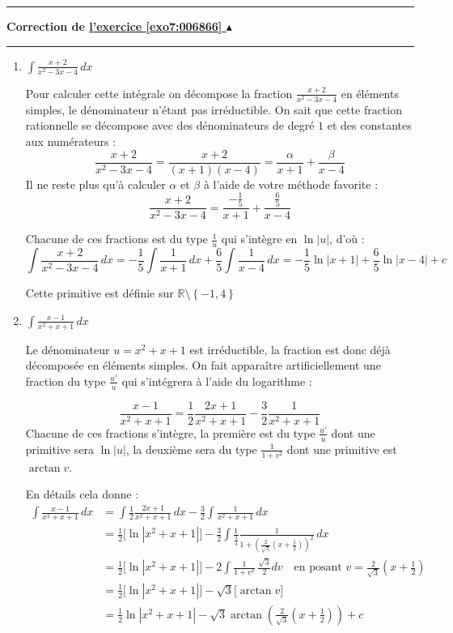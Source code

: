 \documentclass[11pt,a4paper]{article}
\newcommand{\Rr}{\mathbb{R}} \newcommand{\R}{\mathbb{R}}
\newcounter{exo}
\newcommand{\correction}[1]{\hypertarget{cor7:#1}{}\label{cor7:#1}{\bf Correction de \hyperlink{exo7:#1}{l'exercice \ref{exo7:#1} $\blacktriangle$}}\vspace{1mm}\hrule\vspace{1mm}}
\newcommand{\fincorrection}{\vspace{1mm}\hrule\vspace*{7mm}}
\begin{document}
\fincorrection
\correction{006866}
\begin{enumerate}
  \item $\int \frac{x+2}{x^2-3x-4}\,dx$

Pour calculer cette intégrale on décompose la fraction $\frac{x+2}{x^2-3x-4}$ en éléments simples, 
le dénominateur n'étant pas irréductible.
On sait que cette fraction rationnelle se décompose avec des dénominateurs de degré $1$ et des constantes aux numérateurs :
$$\frac{x+2}{x^2-3x-4} = \frac{x+2}{(x+1)(x-4)} = \frac{\alpha}{x+1} + \frac{\beta}{x-4}$$
Il ne reste plus qu'à calculer $\alpha$ et $\beta$ à l'aide de votre méthode favorite :
$$\frac{x+2}{x^2-3x-4}  = \frac{-\frac15}{x+1} + \frac{\frac65}{x-4}$$

Chacune de ces fractions est du type $\frac 1u$ qui s'intègre en $\ln |u|$, d'où :
$$\int \frac{x+2}{x^2-3x-4}\,dx = -\frac15\int \frac{1}{x+1}\,dx + \frac65\int \frac{1}{x-4}\,dx
= -\frac15 \ln |x+1| + \frac65 \ln |x-4| + c$$

Cette primitive est définie sur $\Rr\setminus\left\{-1,4\right\} $


  \item $\int \frac{x-1}{x^2+x+1}\,dx$

Le dénominateur $u=x^2+x+1$ est irréductible, la fraction est donc déjà décomposée en éléments simples.
On fait apparaître artificiellement une fraction du type $\frac {u'}{u}$
qui s'intégrera à l'aide du logarithme :

$$\frac{x-1}{x^2+x+1} =  \frac 12 \frac{2x+1}{x^2+x+1} - \frac 32 \frac{1}{x^2+x+1}$$
Chacune de ces fractions s’intègre, la première est du type $\frac {u'}{u}$ dont une primitive sera $\ln |u|$, la deuxième sera 
du type $\frac{1}{1+v^2}$ dont une primitive est $\arctan v$.

En détails cela donne :
\begin{align*}
\int \frac{x-1}{x^2+x+1}\,dx 
  &= \int  \frac 12 \frac{2x+1}{x^2+x+1} \, dx  - \frac 32\int \frac{1}{x^2+x+1} \, dx \\
  &= \frac 12 \big[ \ln |x^2+x+1| \big] -  \frac 32\int \frac{1}{\frac 34} \frac{1}{1+ \left( \frac{2}{\sqrt3}\left(x+\frac 12\right) \right)^2} \, dx \\
  &= \frac 12 \big[ \ln|x^2+x+1| \big] - 2 \int \frac{1}{1+v^2} \, \frac{\sqrt3}{2} dv \quad \text{en posant } v=\frac{2}{\sqrt3}\left(x+\frac 12\right) \\
  &= \frac 12 \big[ \ln|x^2+x+1| \big] - \sqrt3 \big[\arctan v\big] \\
  &= \frac 12 \ln|x^2+x+1| - \sqrt3 \arctan \left( \frac{2}{\sqrt3}\left(x+\frac 12\right) \right) + c \\
\end{align*}


\end{enumerate}
\end{document}
